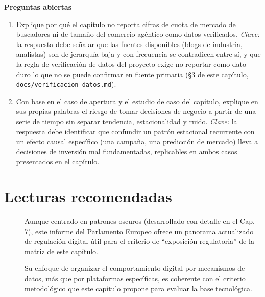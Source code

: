 \textbf{Preguntas abiertas}

\begin{enumerate}
  \item Explique por qué el capítulo no reporta cifras de cuota de mercado
  de buscadores ni de tamaño del comercio agéntico como datos verificados.
  \textit{Clave:} la respuesta debe señalar que las fuentes disponibles
  (blogs de industria, analistas) son de jerarquía baja y con frecuencia se
  contradicen entre sí, y que la regla de verificación de datos del proyecto
  exige no reportar como dato duro lo que no se puede confirmar en fuente
  primaria (§3 de este capítulo, \texttt{docs/verificacion-datos.md}).
  \item Con base en el caso de apertura y el estudio de caso del capítulo,
  explique en sus propias palabras el riesgo de tomar decisiones de negocio
  a partir de una serie de tiempo sin separar tendencia, estacionalidad y
  ruido. \textit{Clave:} la respuesta debe identificar que confundir un
  patrón estacional recurrente con un efecto causal específico (una campaña,
  una predicción de mercado) lleva a decisiones de inversión mal
  fundamentadas, replicables en ambos casos presentados en el capítulo.
\end{enumerate}

\section{Lecturas recomendadas}

\begin{description}
  \item[\textcite{eprs2025darkpatterns}] Aunque centrado en patrones oscuros
  (desarrollado con detalle en el Cap. 7), este informe del Parlamento
  Europeo ofrece un panorama actualizado de regulación digital útil para el
  criterio de \enquote{exposición regulatoria} de la matriz de este
  capítulo.
  \item[\textcite{sheth2026}] Su enfoque de organizar el comportamiento
  digital por mecanismos de datos, más que por plataformas específicas, es
  coherente con el criterio metodológico que este capítulo propone para
  evaluar la base tecnológica.
\end{description}
